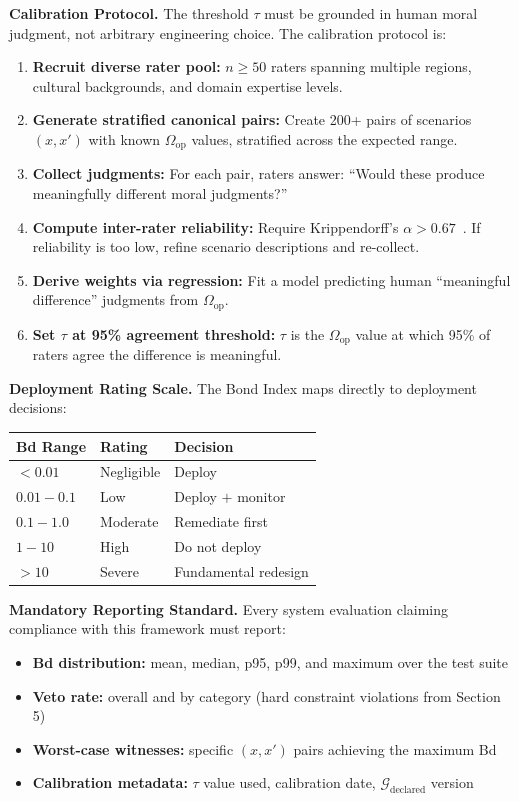 \documentclass[12pt]{article}
\begin{document}
\textbf{Calibration Protocol.} The threshold $\tau$ must be grounded in human moral judgment, not arbitrary engineering choice. The calibration protocol is:

\begin{enumerate}
\item \textbf{Recruit diverse rater pool:} $n \geq 50$ raters spanning multiple regions, cultural backgrounds,
and domain expertise levels.
\item \textbf{Generate stratified canonical pairs:} Create 200+ pairs of scenarios $(x, x')$ with known
$\Omega_{\text{op}}$ values, stratified across the expected range.
\item \textbf{Collect judgments:} For each pair, raters answer: ``Would these produce meaningfully
different moral judgments?''
\item \textbf{Compute inter-rater reliability:} Require Krippendorff's $\alpha > 0.67$~\cite{krippendorff2004}. If reliability is
too low, refine scenario descriptions and re-collect.
\item \textbf{Derive weights via regression:} Fit a model predicting human ``meaningful difference''
judgments from $\Omega_{\text{op}}$.
\item \textbf{Set $\tau$ at 95\% agreement threshold:} $\tau$ is the $\Omega_{\text{op}}$ value at which 95\% of raters agree the
difference is meaningful.
\end{enumerate}

\textbf{Deployment Rating Scale.} The Bond Index maps directly to deployment decisions:

\begin{table}[h]
\centering
\begin{tabular}{lll}
\toprule
\textbf{Bd Range} & \textbf{Rating} & \textbf{Decision} \\
\midrule
$< 0.01$ & Negligible & Deploy \\
$0.01 - 0.1$ & Low & Deploy $+$ monitor \\
$0.1 - 1.0$ & Moderate & Remediate first \\
$1 - 10$ & High & Do not deploy \\
$> 10$ & Severe & Fundamental redesign \\
\bottomrule
\end{tabular}
\end{table}

\textbf{Mandatory Reporting Standard.} Every system evaluation claiming compliance with this
framework must report:
\begin{itemize}
\item \textbf{Bd distribution:} mean, median, p95, p99, and maximum over the test suite
\item \textbf{Veto rate:} overall and by category (hard constraint violations from Section 5)
\item \textbf{Worst-case witnesses:} specific $(x, x')$ pairs achieving the maximum Bd
\item \textbf{Calibration metadata:} $\tau$ value used, calibration date, $\mathcal{G}_{\text{declared}}$ version
\end{itemize}
\end{document}
